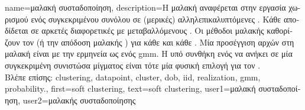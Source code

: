 {name={\foreignlanguage{greek}{μαλακή συσταδοποίηση}}, 
	description={\foreignlanguage{greek}{Η μαλακή}  
		\foreignlanguage{greek}{αναφέρεται στην εργασία χωρισμού ενός συγκεκριμένου συνόλου}  
		\foreignlanguage{greek}{σε (μερικές) αλληλεπικαλυπτόμενες} . 
		\foreignlanguage{greek}{Κάθε}  \foreignlanguage{greek}{αποδίδεται σε αρκετές διαφορετικές} 
		 \foreignlanguage{greek}{με μεταβαλλόμενους} . \foreignlanguage{greek}{Οι 
		μέθοδοι μαλακής}  \foreignlanguage{greek}{καθορίζουν τον}
		 (\foreignlanguage{greek}{ή την απόδοση μαλακής} ) \foreignlanguage{greek}{για 
		κάθε}  \foreignlanguage{greek}{και κάθε} .
		\foreignlanguage{greek}{Μία προσέγγιση αρχών στη μαλακή}  \foreignlanguage{greek}{είναι 
		με την ερμηνεία}  \foreignlanguage{greek}{ως}   
		\foreignlanguage{greek}{ενός} \gls{gmm}. \foreignlanguage{greek}{Η υπό συνθήκη}  
		\foreignlanguage{greek}{ενός}  \foreignlanguage{greek}{να ανήκει σε μία συγκεκριμένη συνιστώσα 
		μίγματος είναι τότε μία φυσική επιλογή για τον} . \\
		\foreignlanguage{greek}{Βλέπε επίσης:} \gls{clustering}, \gls{datapoint}, \gls{cluster}, \gls{dob}, \gls{iid}, \gls{realization}, \gls{gmm}, \gls{probability}.},
	first={soft clustering},
	text={soft clustering},
	user1={\foreignlanguage{greek}{μαλακή συσταδοποίηση}}, %
	user2={\foreignlanguage{greek}{μαλακής συσταδοποίησης}} %
}

